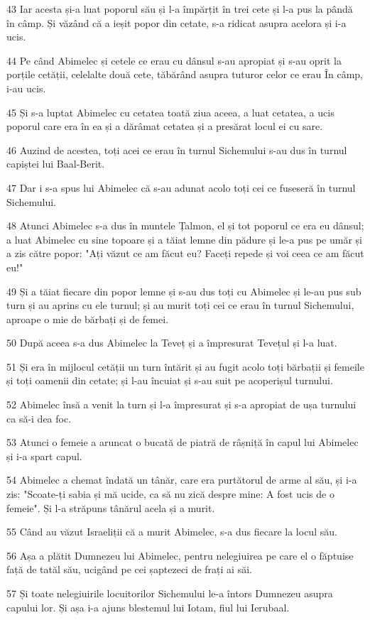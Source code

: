 \par 43 Iar acesta și-a luat poporul său și l-a împărțit în trei cete și l-a pus la pândă în câmp. Și văzând că a ieșit popor din cetate, s-a ridicat asupra acelora și i-a ucis.
\par 44 Pe când Abimelec și cetele ce erau cu dânsul s-au apropiat și s-au oprit la porțile cetății, celelalte două cete, tăbărând asupra tuturor celor ce erau În câmp, i-au ucis.
\par 45 Și s-a luptat Abimelec cu cetatea toată ziua aceea, a luat cetatea, a ucis poporul care era în ea și a dărâmat cetatea și a presărat locul ei cu sare.
\par 46 Auzind de acestea, toți acei ce erau în turnul Sichemului s-au dus în turnul capiștei lui Baal-Berit.
\par 47 Dar i s-a spus lui Abimelec că s-au adunat acolo toți cei ce fuseseră în turnul Sichemului.
\par 48 Atunci Abimelec s-a dus în muntele Țalmon, el și tot poporul ce era eu dânsul; a luat Abimelec cu sine topoare și a tăiat lemne din pădure și le-a pus pe umăr și a zis către popor: "Ați văzut ce am făcut eu? Faceți repede și voi ceea ce am făcut eu!"
\par 49 Și a tăiat fiecare din popor lemne și s-au dus toți cu Abimelec și le-au pus sub turn și au aprins cu ele turnul; și au murit toți cei ce erau în turnul Sichemului, aproape o mie de bărbați și de femei.
\par 50 După aceea s-a dus Abimelec la Teveț și a împresurat Tevețul și l-a luat.
\par 51 Și era în mijlocul cetății un turn întărit și au fugit acolo toți bărbații și femeile și toți oamenii din cetate; și l-au încuiat și s-au suit pe acoperișul turnului.
\par 52 Abimelec însă a venit la turn și l-a împresurat și s-a apropiat de ușa turnului ca să-i dea foc.
\par 53 Atunci o femeie a aruncat o bucată de piatră de râșniță în capul lui Abimelec și i-a spart capul.
\par 54 Abimelec a chemat îndată un tânăr, care era purtătorul de arme al său, și i-a zis: "Scoate-ți sabia și mă ucide, ca să nu zică despre mine: A fost ucis de o femeie". Și l-a străpuns tânărul acela și a murit.
\par 55 Când au văzut Israeliții că a murit Abimelec, s-a dus fiecare la locul său.
\par 56 Așa a plătit Dumnezeu lui Abimelec, pentru nelegiuirea pe care el o făptuise față de tatăl său, ucigând pe cei șaptezeci de frați ai săi.
\par 57 Și toate nelegiuirile locuitorilor Sichemului le-a întors Dumnezeu asupra capului lor. Și așa i-a ajuns blestemul lui Iotam, fiul lui Ierubaal.

